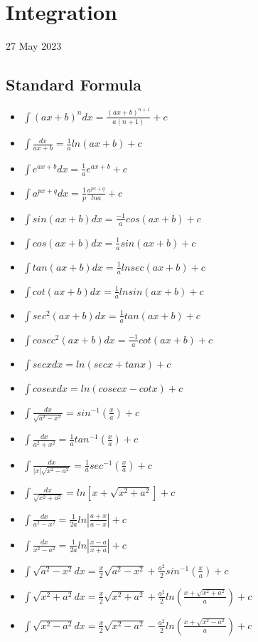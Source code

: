 \documentclass[twocolumn, 10pt]{article}
\begin{document}
\section{Integration}
27 May 2023
\subsection{Standard Formula}
\begin{itemize}
\item $\int(ax+b)^n dx=\frac{(ax+b)^{n+1}}{a(n+1)}+c$
\item $\int \frac{dx}{ax+b}=\frac{1}{a} ln(ax+b)  +c$
\item $\int e^{ax+b}dx= \frac{1}{a} e^{ax+b}+c$
\item $\int a^{px+q}dx=\frac{1}{p}\frac{a^{px+q}}{lna} +c$
\item $\int sin(ax+b)dx=\frac{-1}{a}cos(ax+b)+c$
\item $\int cos(ax+b)dx=\frac{1}{a}sin(ax+b)+c$
\item $\int tan(ax+b)dx=\frac{1}{a}lnsec(ax+b)+c$
\item $\int cot(ax+b)dx=\frac{1}{a}lnsin(ax+b)+c$
\item $\int sec^2(ax+b)dx=\frac{1}{a}tan(ax+b)+c$
\item $\int cosec^2(ax+b)dx=\frac{-1}{a}cot(ax+b)+c$
\item $\int secxdx=ln(secx+tanx)+c$
\item $\int cosexdx=ln(cosecx-cotx)+c$
\item $\int \frac{dx}{\sqrt{a^2-x^2}}=sin^{-1}(\frac{x}{a})+c$
\item $\int \frac{dx}{a^2+x^2}=\frac{1}{a}tan^{-1}(\frac{x}{a})+c$
\item $\int \frac{dx}{|x|\sqrt{x^2-a^2}}=\frac{1}{a}sec^{-1}(\frac{x}{a})+c$
\item $\int \frac{dx}{\sqrt{x^2+a^2}}=ln[{x+\sqrt{x^2+a^2}}]+c$
\item $\int \frac{dx}{a^2-x^2}=\frac{1}{2a}ln|\frac{a+x}{a-x}|+c$
\item $\int \frac{dx}{x^2-a^2}=\frac{1}{2a}ln|\frac{x-a}{x+a}|+c$
\item $\int \sqrt{a^2-x^2}dx=\frac{x}{2}\sqrt{a^2-x^2}+\frac{a^2}{2}sin^{-1}(\frac{x}{a})+c$
\item $\int \sqrt{x^2+a^2}dx=\frac{x}{2}\sqrt{x^2+a^2}+\frac{a^2}{2}ln(\frac{x+\sqrt{x^2+a^2}}{a})+c$
\item $\int \sqrt{x^2-a^2}dx=\frac{x}{2}\sqrt{x^2-a^2}-\frac{a^2}{2}ln(\frac{x+\sqrt{x^2-a^2}}{a})+c$
\end{itemize}
\end{document}
